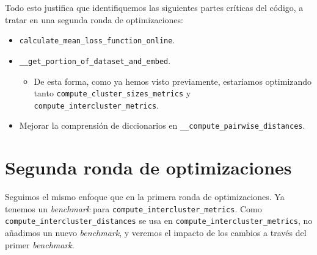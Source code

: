 Todo esto justifica que identifiquemos las siguientes partes críticas del código, a tratar en una segunda ronda de optimizaciones:

\begin{itemize}
	\item \lstinline{calculate_mean_loss_function_online}.
	\item \lstinline{__get_portion_of_dataset_and_embed}.
	      \begin{itemize}
		      \item De esta forma, como ya hemos visto previamente, estaríamos optimizando tanto \lstinline{compute_cluster_sizes_metrics} y \lstinline{compute_intercluster_metrics}.
	      \end{itemize}
	\item Mejorar la comprensión de diccionarios en \lstinline{__compute_pairwise_distances}.
\end{itemize}

\section{Segunda ronda de optimizaciones} \label{isubs:segunda_ronda_optimizaciones}

Seguimos el mismo enfoque que en la primera ronda de optimizaciones. Ya tenemos un \textit{benchmark} para \lstinline{compute_intercluster_metrics}. Como \lstinline{compute_intercluster_distances} se usa en \lstinline{compute_intercluster_metrics}, no añadimos un nuevo \textit{benchmark}, y veremos el impacto de los cambios a través del primer \textit{benchmark}.

